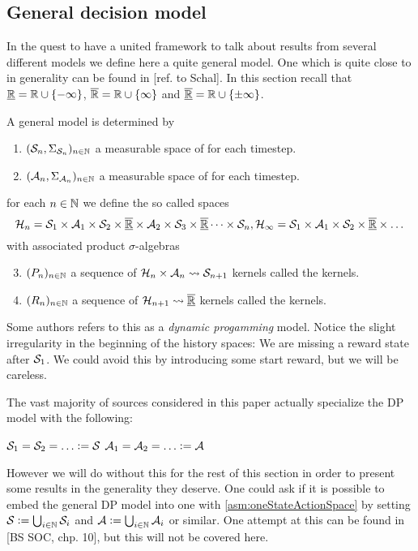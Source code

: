 
\subsection{General decision model}
In the quest to have a united framework to talk about results from
several different models we define here a quite general model.
One which is quite close to in generality can be found in
[ref. to Schal].
In this section recall that $\underline{\mathbb{R}} = \mathbb{R} \cup \{-\infty\}$,
$\overline{\mathbb{R}} = \mathbb{R} \cup \{\infty\}$ and
$\overline{\underline{\mathbb{R}}} = \mathbb{R} \cup \{\pm \infty\}$.

\begin{defn}
  A general  model is determined by
  \begin{enumerate}
    \item $(\mathcal{S}_n, \Sigma_{\mathcal{S}_n})_{n \in \mathbb{N}}$ a 
      measurable space of  for each timestep.
    \item $(\mathcal{A}_n, \Sigma_{\mathcal{A}_n})_{n \in \mathbb{N}}$ a 
      measurable space of  for each timestep.
  \end{enumerate}
  for each $n \in \mathbb{N}$ we define the so called  spaces
  \[ \mathcal{H}_n = \mathcal{S}_1 \times \mathcal{A}_1
    \times \mathcal{S}_2 \times \overline{\underline{\mathbb{R}}} \times \mathcal{A}_2
    \times \mathcal{S}_3 \times \overline{\underline{\mathbb{R}}} \dots \times \mathcal{S}_n,
    \mathcal{H}_\infty = \mathcal{S}_1 \times \mathcal{A}_1 \times \mathcal{S}_2 \times
    \overline{\underline{\mathbb{R}}} \times \dots
  \]
  with associated product $\sigma$-algebras
  \begin{enumerate} \setcounter{enumi}{2}
    \item $(P_n)_{n \in \mathbb{N}}$ a sequence of
      $\mathcal{H}_n \times \mathcal{A}_n \leadsto \mathcal{S}_{n+1}$ kernels
      called the  kernels.
    \item $(R_n)_{n \in \mathbb{N}}$ a sequence of
      $\mathcal{H}_{n+1} \leadsto \overline{\underline{\mathbb{R}}}$ kernels
      called the  kernels.
  \end{enumerate}
\end{defn}
Some authors refers to this as a \emph{dynamic progamming} model.
Notice the slight irregularity in the beginning of the history spaces:
We are missing a reward state after $\mathcal{S}_1$. We could avoid
this by introducing some start reward, but we will be careless.

The vast majority of sources considered in this paper actually specialize
the DP model with the following:
\begin{asm}
  $\Cal{S}_1 = \Cal{S}_2 = \dots \defeq \Cal{S}$
  $\Cal{A}_1 = \Cal{A}_2 = \dots \defeq \Cal{A}$
  \label{asm:oneStateActionSpace}
\end{asm}
However we will do without this for the rest of this section in order to
present some results in the generality they deserve.
One could ask if it is possible to embed the general DP model into one
with \cref{asm:oneStateActionSpace} by setting
$\mathcal{S} \vcentcolon= \bigcup_{i\in\mathbb{N}} \mathcal{S}_i$ and
$\mathcal{A} \vcentcolon= \bigcup_{i\in\mathbb{N}} \mathcal{A}_i$ or similar.
One attempt at this can be found in [BS SOC, chp. 10],
but this will not be covered here. %

